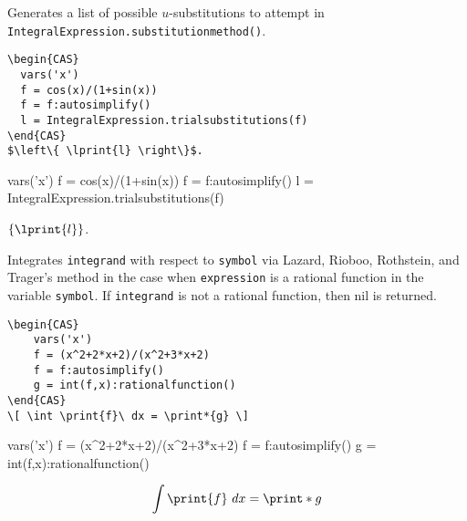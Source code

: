 
Generates a list of possible $u$-substitutions to attempt in \texttt{IntegralExpression.substitutionmethod()}. 

\begin{codebox}
    \begin{verbatim}
\begin{CAS}
  vars('x')
  f = cos(x)/(1+sin(x))
  f = f:autosimplify()
  l = IntegralExpression.trialsubstitutions(f)
\end{CAS}
$\left\{ \lprint{l} \right\}$.
\end{verbatim}
\tcblower
\begin{CAS}
    vars('x')
    f = cos(x)/(1+sin(x))
    f = f:autosimplify()
    l = IntegralExpression.trialsubstitutions(f)
\end{CAS}
$ \left\{ \lprint{l} \right\}$.
\end{codebox}



Integrates \texttt{integrand} with respect to \texttt{symbol} via Lazard, Rioboo, Rothstein, and Trager's method in the case when \texttt{expression} is a rational function in the variable \texttt{symbol}. If \texttt{integrand} is not a rational function, then nil is returned. 

\begin{codebox}
    \begin{verbatim}
\begin{CAS}
    vars('x')
    f = (x^2+2*x+2)/(x^2+3*x+2)
    f = f:autosimplify()
    g = int(f,x):rationalfunction()
\end{CAS}
\[ \int \print{f}\ dx = \print*{g} \] 
\end{verbatim}
\tcblower
\begin{CAS}
    vars('x')
    f = (x^2+2*x+2)/(x^2+3*x+2)
    f = f:autosimplify()
    g = int(f,x):rationalfunction()
\end{CAS}
\[ \int \print{f}\ dx = \print*{g} \] 
\end{codebox}

